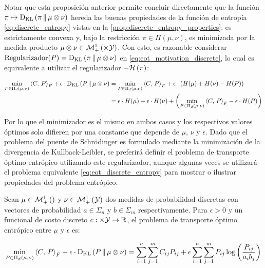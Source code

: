 Notar que esta proposición anterior permite concluir directamente que la función $\pi\mapsto\operatorname{D_{KL}}\left(\pi\,\|\,\mu\otimes\nu\right)$ hereda las buenas propiedades de la función de entropía \eqref{eq:discrete_entropy} vistas en la \autoref{prop:discrete_entropy_properties}: es estrictamente convexa y, bajo la restricción $\pi\in\Pi(\mu,\nu)$, es minimizada por la medida producto $\mu\otimes\nu\in\probmeasure{\xspace\times\yspace}$. Con esto, es razonable considerar $\text{Regularizador}(P)=\operatorname{D_{KL}}\left(\pi\,\|\,\mu\otimes\nu\right)$ en \eqref{eq:eot_motivation_discrete}, lo cual es equivalente a utilizar el regularizador $-\mathcal{H}\left(\pi\right)$:

\begin{align*}
	\min_{P\in\Pi_d(\mu,\nu)} \left\langle C,\,P\right\rangle_F + \epsilon \cdot\operatorname{D_{KL}}\left(P\,\|\,\mu\otimes\nu\right)
	 & = \min_{P\in\Pi_d(\mu,\nu)}  \left\langle C,\,P\right\rangle_F + \epsilon\cdot\left(H(\mu) + H(\nu) - H(P)\right)                              \\
	 & = \epsilon\cdot H(\mu) + \epsilon\cdot H(\nu) + \left(\min_{P\in\Pi_d(\mu,\nu)}  \left\langle C,\,P\right\rangle_F - \epsilon\cdot H(P)\right)
\end{align*}

Por lo que el minimizador es el mismo en ambos casos y los respectivos valores óptimos solo difieren por una constante que depende de $\mu$, $\nu$ y $\epsilon$. Dado que el problema del puente de Schrödinger es formulado mediante la minimización de la divergencia de Kullback-Leibler, se preferirá definir el problema de transporte óptimo entrópico utilizando este regularizador, aunque algunas veces se utilizará el problema equivalente \eqref{eq:eot_discrete_entropy} para mostrar o ilustrar propiedades del problema entrópico.

\begin{defn}
	\label{defn:eot_discrete}
	Sean $\mu\in\mathcal{M}_+^1\left(\right)$ y $\nu\in\mathcal{M}_+^1\left(\mathcal{Y}\right)$ dos medidas de probabilidad discretas con vectores de probabilidad $a\in\Sigma_n$ y $b\in\Sigma_m$ respectivamente. Para $\epsilon>0$ y un funcional de costo discreto $c:\times\mathcal{Y}\to\mathbb{R}$, el problema de transporte óptimo entrópico entre $\mu$ y $\epsilon$ es:

	\begin{equation}
		\label{eq:eot_discrete_kl}
		\min_{P\in\Pi_d(\mu,\nu)} \left\langle C,\,P\right\rangle_F + \epsilon \cdot\operatorname{D_{KL}}\left(P\,\|\,\mu\otimes\nu\right)
		= \sum_{i=1}^n\sum_{j=1}^m C_{ij}P_{ij} + \epsilon \sum_{i=1}^n\sum_{j=1}^m P_{ij}\log\left(\frac{P_{ij}}{a_ib_j}\right)
	\end{equation}
\end{defn}


